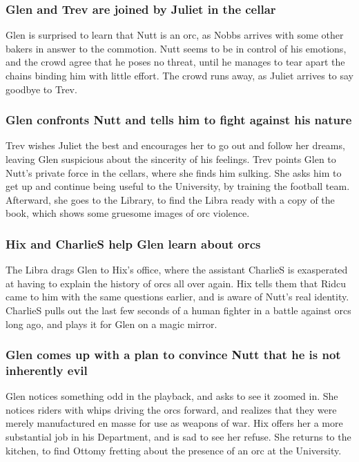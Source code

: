 \subsubsection{\Gls{Glen} and \Gls{Trev} are joined by \Gls{Juliet} in the cellar}
\Gls{Glen} is surprised to learn that \Gls{Nutt} is an orc, as \Gls{Nobbs} arrives with some other
bakers in answer to the commotion. \Gls{Nutt} seems to be in control of his emotions, and the
crowd agree that he poses no threat, until he manages to tear apart the chains binding him with
little effort. The crowd runs away, as \Gls{Juliet} arrives to say goodbye to \Gls{Trev}.

\subsubsection{\Gls{Glen} confronts \Gls{Nutt} and tells him to fight against his nature}
\Gls{Trev} wishes \Gls{Juliet} the best and encourages her to go out and follow her dreams, leaving
\Gls{Glen} suspicious about the sincerity of his feelings. \Gls{Trev} points \Gls{Glen} to
\Gls{Nutt}'s private force in the cellars, where she finds him sulking. She asks him to get up and
continue being useful to the University, by training the football team. Afterward, she goes to the
Library, to find the \Gls{Libra} ready with a copy of the book, which shows some gruesome images of
orc violence.

\subsubsection{\Gls{Hix} and \Gls{CharlieS} help \Gls{Glen} learn about orcs}
The \Gls{Libra} drags \Gls{Glen} to \Gls{Hix}'s office, where the assistant \Gls{CharlieS} is
exasperated at having to explain the history of orcs all over again. \Gls{Hix} tells them that
\Gls{Ridcu} came to him with the same questions earlier, and is aware of \Gls{Nutt}'s real identity.
\Gls{CharlieS} pulls out the last few seconds of a human fighter in a battle against orcs long ago,
and plays it for \Gls{Glen} on a magic mirror.

\subsubsection{\Gls{Glen} comes up with a plan to convince \Gls{Nutt} that he is not inherently
    evil}
\Gls{Glen} notices something odd in the playback, and asks to see it zoomed in. She notices riders
with whips driving the orcs forward, and realizes that they were merely manufactured en masse for
use as weapons of war. \Gls{Hix} offers her a more substantial job in his Department, and is sad to
see her refuse. She returns to the kitchen, to find \Gls{Ottomy} fretting about the presence of an
orc at the University.

